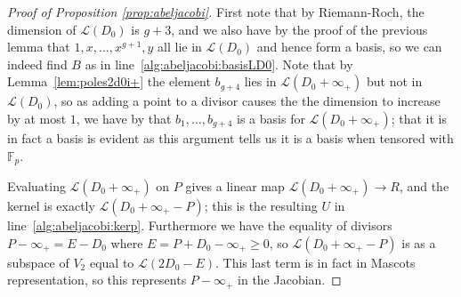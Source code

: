 \documentclass[12pt]{article}
\newcommand{\Lcal}{\mathcal{L}}
\newcommand{\F}{\mathbb{F}}
\theoremstyle{plain}
\theoremstyle{definition}
\theoremstyle{remark}
\begin{document}
\begin{proof}[Proof of Proposition \ref{prop:abeljacobi}]
First note that by Riemann-Roch, the dimension of $\Lcal(D_0)$ is $g + 3$, and we also have by the proof of the previous lemma that $1,x,\dots,x^{g+1},y$ all lie in $\Lcal(D_0)$ and hence form a basis, so we can indeed find $B$ as in line~\ref{alg:abeljacobi:basisLD0}. Note that by Lemma~\ref{lem:poles2d0i+} the element $b_{g+4}$ lies in $\Lcal(D_0 + \infty_+)$ but not in $\Lcal(D_0)$, so as adding a point to a divisor causes the the dimension to increase by at most $1$, we have by that $b_1,\dots,b_{g+4}$ is a basis for $\Lcal(D_0 + \infty_+)$; that it is in fact a basis is evident as this argument tells us it is a basis when tensored with $\F_p$.

Evaluating $\Lcal(D_0 + \infty_+)$ on $P$ gives a linear map $\Lcal(D_0 + \infty_+) \to R$, and the kernel is exactly $\Lcal(D_0 + \infty_+ - P)$; this is the resulting $U$ in line~\ref{alg:abeljacobi:kerp}. Furthermore we have the equality of divisors $P-\infty_+ = E - D_0$ where $E = P + D_0 - \infty_+ \geq 0$, so $\Lcal(D_0 + \infty_+ - P)$ is as a subspace of $V_2$ equal to $\Lcal(2D_0 - E)$. This last term is in fact in Mascots representation, so this represents $P-\infty_+$ in the Jacobian.
\end{proof}
\end{document}

